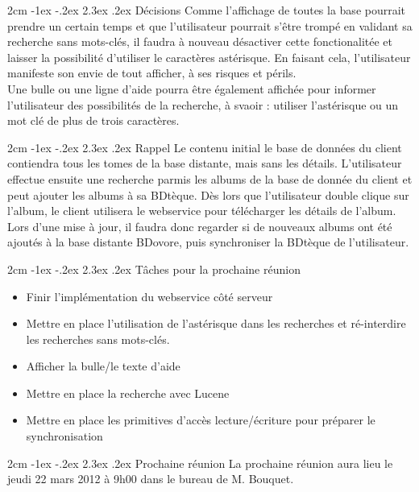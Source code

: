 \documentclass[12pt]{article}
\makeatletter
\renewcommand\section{\@startsection{section}{1}{\z@}%
	{2cm \@plus -1ex \@minus -.2ex}%
	{2.3ex \@plus.2ex}%
	{\reset@font\large\bfseries}}
\makeatother
\begin{document}
\section{Décisions}
Comme l'affichage de toutes la base pourrait prendre un certain temps et que l'utilisateur pourrait s'être trompé en validant sa recherche sans mots-clés, il faudra à nouveau désactiver cette fonctionalitée et laisser la possibilité d'utiliser le caractères astérisque. En faisant cela, l'utilisateur manifeste son envie de tout afficher, à ses risques et périls.\\
Une bulle ou une ligne d'aide pourra être également affichée pour informer l'utilisateur des possibilités de la recherche, à svaoir : utiliser l'astérisque ou un mot clé de plus de trois caractères.

\section{Rappel}
Le contenu initial le base de données du client contiendra tous les tomes de la base distante, mais sans les détails. L'utilisateur effectue ensuite une recherche parmis les albums de la base de donnée du client et peut ajouter les albums à sa BDtèque. Dès lors que l'utilisateur double clique sur l'album, le client utilisera le webservice pour télécharger les détails de l'album.\\
Lors d'une mise à jour, il faudra donc regarder si de nouveaux albums ont été ajoutés à la base distante BDovore, puis synchroniser la BDtèque de l'utilisateur.

\section{Tâches pour la prochaine réunion}
\begin{itemize}
  \item Finir l'implémentation du webservice côté serveur
  \item Mettre en place l'utilisation de l'astérisque dans les recherches et ré-interdire les recherches sans mots-clés.
  \item Afficher la bulle/le texte d'aide
  \item Mettre en place la recherche avec Lucene
  \item Mettre en place les primitives d'accès lecture/écriture pour préparer le synchronisation
\end{itemize}

\section{Prochaine réunion}
La prochaine réunion aura lieu le jeudi 22 mars 2012 à 9h00 dans le bureau de M. Bouquet.
\end{document}
